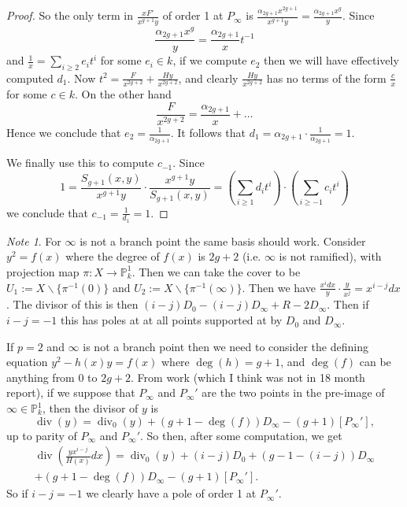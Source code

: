 \documentclass[draft, 11pt]{article} %
\theoremstyle{plain}
\theoremstyle{remark}
\newtheorem*{note}{Note}
\DeclareMathOperator{\di}{div}
\begin{document}
\begin{proof}
So the only term in $\frac{xF'}{x^{g+1}y}$ of order 1 at $P_\infty$ is $\frac{\alpha_{2g+1}x^{2g+1}}{x^{g+1}y} = \frac{\alpha_{2g+1}x^{g}}{y}$.
Since
\[
\frac{\alpha_{2g+1}x^g}{y} = \frac{\alpha_{2g+1}}{x}t^{-1}
\]
and $\frac{1}{x} = \sum_{i\geq 2}e_it^i$ for some $e_i \in k$, if we compute $e_2$ then we will have effectively computed $d_1$.
Now $t^2 = \frac{F }{x^{2g+2}}+ \frac{Hy}{x^{2g+2}}$, and clearly $\frac{Hy}{x^{2g+2}}$ has no terms of the form $\frac{c}{x}$ for some $c \in k$.
On the other hand
\[
\frac{F}{x^{2g+2}} = \frac{\alpha_{2g+1}}{x} + \ldots
\]
Hence we conclude that $e_2 = \frac{1}{\alpha_{2g+1}}$.
It follows that $d_1 = \alpha_{2g+1} \cdot \frac{1}{\alpha_{2g+1}} = 1$.


We finally use this to compute $c_{-1}$.
Since 
\begin{equation*}
1 = \frac{S_{g+1}(x,y)}{x^{g+1}y}\cdot \frac{x^{g+1}y}{S_{g+1}(x,y)} = \left( \sum_{i\geq 1}d_it^i \right) \cdot \left( \sum_{i\geq -1}c_it^i\right)
\end{equation*}
we conclude that $c_{-1} = \frac{1}{d_{1}} = 1$.




\end{proof}



\begin{comment}
We define $\alpha^i_j$ and $\Alpha^i_{j+1}$ for $0 \leq j \leq 2g$, and $B_k^i$ for $1\leq k \leq g$, such that
\[
$s_i(x) = \alpha^i_{2g}x^{2g} + \ldots + \alpha^i_0 \ {\rm and } \ S_i(x) = A_{2g+1}^ix^{2g+1} + \ldots + A^i_1 x + y(B_g^i x^i + \ldots + B_1^i x).
\]
\end{comment}


\begin{note}
For $\infty$ is not a branch point the same basis should work. 
Consider $y^2 = f(x)$ where the degree of $f(x)$ is $2g+2$ (i.e. $\infty$ is not ramified), with projection map $\pi : X \rightarrow \mathbb P_k^1$.
Then we can take the cover to be $U_1 := X \backslash \{\pi^{-1}(0)\}$ and $U_2 := X \backslash \{\pi^{-1}(\infty)\}$.
Then we have $\frac{x^idx}{y} \cdot \frac{y}{x^{j}} = x^{i-j}dx$.
The divisor of this is then $(i-j)D_0 -(i-j)D_\infty + R - 2D_\infty$.
Then if $i-j = -1$ this has poles at at all points supported at by $D_0$ and $D_\infty$.


If $p=2$ and $\infty$ is not a branch point then we need to consider the defining equation $y^2 - h(x)y = f(x)$ where $\deg(h)=g+1$, and $\deg(f)$ can be anything from 0 to $2g+2$.
From work (which I think was not in 18 month report), if we suppose that $P_\infty$ and $P_\infty'$ are the two points in the pre-image of $\infty \in \mathbb P_k^1$, then the divisor of $y$ is
\[
\di(y) = \di_0(y) +(g+1 - \deg(f))D_\infty - (g+1)[P_\infty'],
\]
up to parity of $P_\infty$ and $P_\infty'$.
So then, after some computation, we get
\begin{multline*}
\di\left(\frac{yx^{i-j}}{H(x)}dx \right) = \di_0(y) + (i-j)D_0 + (g-1-(i-j))D_\infty \\ + (g+1-\deg(f))D_\infty -(g+1)[P_\infty'].
\end{multline*}
So if $i-j = -1$ we clearly have a pole of order 1 at $P_\infty'$.
\end{note}
\end{document}
